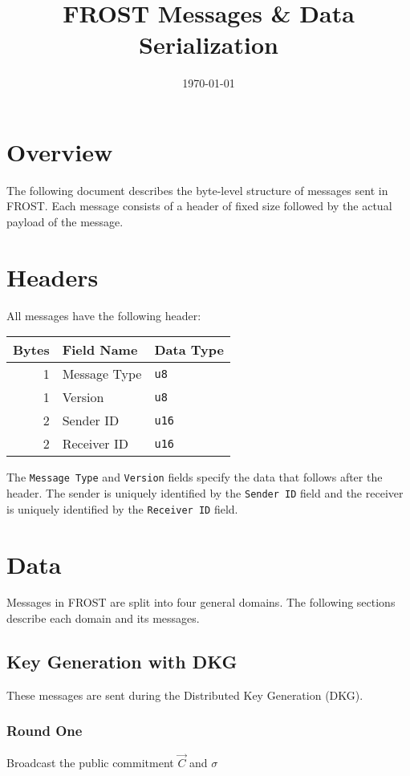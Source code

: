 \documentclass[11pt]{article}
\date{\today}
\title{FROST Messages \& Data Serialization}
\begin{document}
\maketitle
\tableofcontents


\section{Overview}
\label{sec:org861ac28}
The following document describes the byte-level structure of messages sent in
FROST. Each message consists of a header of fixed size followed by the actual
payload of the message.

\section{Headers}
\label{sec:org57ec693}
All messages have the following header:

\begin{center}
\begin{tabular}{rll}
Bytes & Field Name & Data Type\\
\hline
1 & Message Type & \texttt{u8}\\
1 & Version & \texttt{u8}\\
2 & Sender ID & \texttt{u16}\\
2 & Receiver ID & \texttt{u16}\\
\end{tabular}
\end{center}

The \texttt{Message Type} and \texttt{Version} fields specify the data that follows after the
header. The sender is uniquely identified by the \texttt{Sender ID} field and the receiver
is uniquely identified by the \texttt{Receiver ID} field. 

\section{Data}
\label{sec:org93c68ce}
Messages in FROST are split into four general domains. The following sections
describe each domain and its messages.

\subsection{Key Generation with DKG}
\label{sec:org485021f}
These messages are sent during the Distributed Key Generation (DKG).

\subsubsection{Round One}
\label{sec:org4a9cfdd}
Broadcast the public commitment \(\vec{C}\) and \(\sigma\) \\
\end{document}
